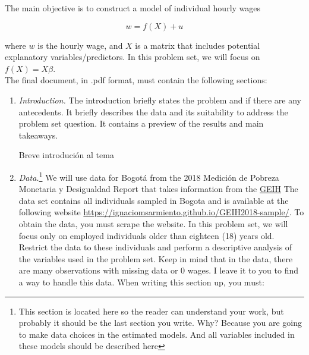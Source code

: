 \documentclass[12pt,a4paper,onecolumn]{article}
\begin{document}
The main objective is to construct a model of individual hourly wages

\begin{equation}
    w = f(X)+u
\end{equation}

where $w$ is the hourly wage, and $X$ is a matrix that includes potential explanatory variables/predictors. In this problem set, we will focus on $f(X) = X\beta$.\\
The final document, in .pdf format, must contain the following sections:

\begin{enumerate}
    \item \textit{Introduction.} The introduction briefly states the problem and if there are any antecedents. It briefly describes the data and its suitability to address the problem set question. It contains a preview of the results and main takeaways.

    Breve introduci\'on al tema






    
    \item \textit{Data.}\footnote{This section is located here so the reader can understand your work, but probably it should be the last section you write. Why? Because you are going to make data choices in the estimated models. And all variables included in these models should be described here} We will use data for Bogot\'a from the 2018 Medici\'on de Pobreza Monetaria y Desigualdad Report that takes information from the \href{https://www.dane.gov.co/index.php/estadisticas-por-tema/mercado-laboral/empleo-y-desempleo/geih-historicos}{GEIH}
    The data set contains all individuals sampled in Bogota and is available at the following website \url {https://ignaciomsarmiento.github.io/GEIH2018-sample/}. To obtain the data, you must scrape the website. In this problem set, we will focus only on employed individuals older than eighteen (18) years old. Restrict the data to these individuals and perform a descriptive analysis of the variables used in the problem set. Keep in mind that in the data, there are many observations with missing data or 0 wages. I leave it to you to find a way to handle this data.
    When writing this section up, you must:


\end{enumerate}
\end{document}
